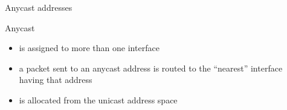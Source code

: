 \begin{frame}{Anycast addresses}
  \begin{figure}
    \centering
    \quad
    \quad
    \quad
  \end{figure}
  \begin{iblock}{Anycast}
    \begin{itemize}
    \item is assigned to more than one interface
    \item a packet sent to an anycast address is routed to the ``nearest'' interface having
      that address
    \item is allocated from the unicast address space
    \end{itemize}
  \end{iblock}
\end{frame}


